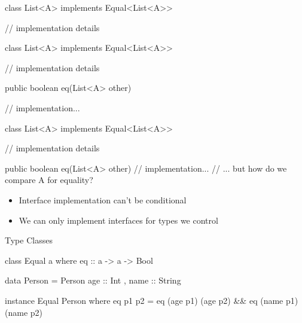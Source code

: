 \documentclass[usenames,dvipsnames,svgnames,table,aspectratio=169,mathserif]{beamer}
\newcommand{\nl}{\vspace{\baselineskip}}
\newcommand{\pnl}{\pause \nl}
\begin{document}
\begin{frame}[fragile]
\begin{javacode}
class List<A> implements Equal<List<A>> {
  // implementation details





}
\end{javacode}
\end{frame}


\begin{frame}[fragile]
\begin{javacode}
class List<A> implements Equal<List<A>> {
  // implementation details

  public boolean eq(List<A> other) {
    // implementation...

  }
}
\end{javacode}
\end{frame}


\begin{frame}[fragile]
\begin{javacode}
class List<A> implements Equal<List<A>> {
  // implementation details

  public boolean eq(List<A> other) {
    // implementation...
    // ... but how do we compare A for equality?
  }
}
\end{javacode}
\end{frame}


\begin{frame}
\begin{itemize}
\item Interface implementation can't be conditional
\item We can only implement interfaces for types we control
\end{itemize}

\end{frame}




\begin{frame}
\begin{center}
\huge{Type Classes}
\end{center}
\end{frame}


\begin{frame}[fragile]
\begin{haskellcode}
class Equal a where
  eq :: a -> a -> Bool
\end{haskellcode}

\pnl

\begin{haskellcode}
data Person = Person {
  age :: Int
, name :: String
}
\end{haskellcode}

\pnl

\begin{haskellcode}
instance Equal Person where
  eq p1 p2 = eq (age p1) (age p2) && eq (name p1) (name p2)
\end{haskellcode}

\end{frame}
\end{document}
